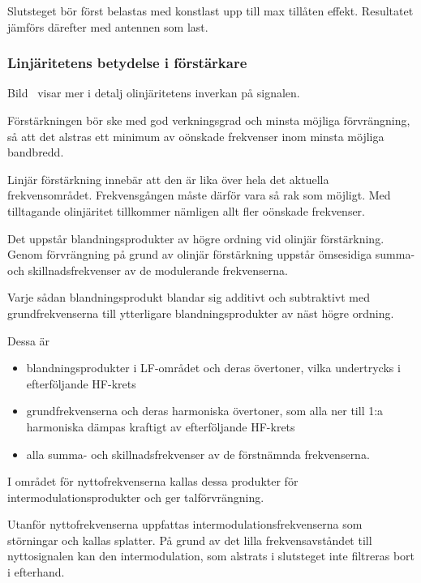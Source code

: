 Slutsteget bör först belastas med konstlast upp till max tillåten effekt.
Resultatet jämförs därefter med antennen som last.

\subsubsection{Linjäritetens betydelse i förstärkare}


Bild~ visar mer i detalj olinjäritetens inverkan på
signalen.

Förstärkningen bör ske med god verkningsgrad och minsta möjliga förvrängning,
så att det alstras ett minimum av oönskade frekvenser inom minsta möjliga
bandbredd.

Linjär förstärkning innebär att den är lika över hela det aktuella
frekvensområdet.
Frekvensgången måste därför vara så rak som möjligt.
Med tilltagande olinjäritet tillkommer nämligen allt fler oönskade frekvenser.

Det uppstår blandningsprodukter av högre ordning vid olinjär förstärkning.
Genom förvrängning på grund av olinjär förstärkning uppstår ömsesidiga summa-
och skillnadsfrekvenser av de modulerande frekvenserna.

Varje sådan blandningsprodukt blandar sig additivt och subtraktivt med
grundfrekvenserna till ytterligare blandningsprodukter av näst högre ordning.

Dessa är
\begin{itemize}
\item blandningsprodukter i LF-området och deras övertoner, vilka
  undertrycks i efterföljande HF-krets

\item grundfrekvenserna och deras harmoniska övertoner, som alla ner
  till 1:a harmoniska dämpas kraftigt av efterföljande HF-krets

\item alla summa- och skillnadsfrekvenser av de förstnämnda frekvenserna.
\end{itemize}

I området för nyttofrekvenserna kallas dessa produkter för
intermodulationsprodukter och ger talförvrängning.

Utanför nyttofrekvenserna uppfattas intermodulationsfrekvenserna som
störningar och kallas splatter.
På grund av det lilla frekvensavståndet till nyttosignalen kan den
intermodulation, som alstrats i slutsteget inte filtreras bort i efterhand.

